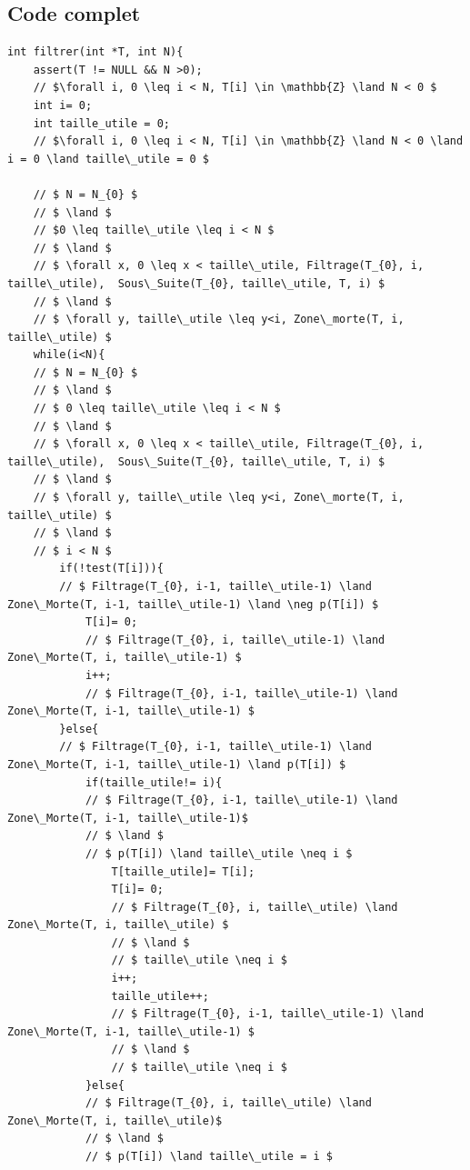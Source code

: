 \documentclass[a4paper, 11pt, oneside]{article}
\begin{document}
\subsection{Code complet}
\begin{lstlisting}
int filtrer(int *T, int N){
    assert(T != NULL && N >0);
    // $\forall i, 0 \leq i < N, T[i] \in \mathbb{Z} \land N < 0 $
    int i= 0;
    int taille_utile = 0;
    // $\forall i, 0 \leq i < N, T[i] \in \mathbb{Z} \land N < 0 \land i = 0 \land taille\_utile = 0 $ 

    // $ N = N_{0} $
    // $ \land $
    // $0 \leq taille\_utile \leq i < N $
    // $ \land $
    // $ \forall x, 0 \leq x < taille\_utile, Filtrage(T_{0}, i, taille\_utile),  Sous\_Suite(T_{0}, taille\_utile, T, i) $
    // $ \land $
    // $ \forall y, taille\_utile \leq y<i, Zone\_morte(T, i, taille\_utile) $
    while(i<N){
    // $ N = N_{0} $
    // $ \land $
    // $ 0 \leq taille\_utile \leq i < N $
    // $ \land $
    // $ \forall x, 0 \leq x < taille\_utile, Filtrage(T_{0}, i, taille\_utile),  Sous\_Suite(T_{0}, taille\_utile, T, i) $
    // $ \land $
    // $ \forall y, taille\_utile \leq y<i, Zone\_morte(T, i, taille\_utile) $
    // $ \land $
    // $ i < N $
        if(!test(T[i])){
        // $ Filtrage(T_{0}, i-1, taille\_utile-1) \land  Zone\_Morte(T, i-1, taille\_utile-1) \land \neg p(T[i]) $
            T[i]= 0;
            // $ Filtrage(T_{0}, i, taille\_utile-1) \land  Zone\_Morte(T, i, taille\_utile-1) $
            i++;
            // $ Filtrage(T_{0}, i-1, taille\_utile-1) \land  Zone\_Morte(T, i-1, taille\_utile-1) $
        }else{
        // $ Filtrage(T_{0}, i-1, taille\_utile-1) \land  Zone\_Morte(T, i-1, taille\_utile-1) \land p(T[i]) $
            if(taille_utile!= i){
            // $ Filtrage(T_{0}, i-1, taille\_utile-1) \land  Zone\_Morte(T, i-1, taille\_utile-1)$
            // $ \land $
            // $ p(T[i]) \land taille\_utile \neq i $
                T[taille_utile]= T[i];
                T[i]= 0;
                // $ Filtrage(T_{0}, i, taille\_utile) \land  Zone\_Morte(T, i, taille\_utile) $
                // $ \land $
                // $ taille\_utile \neq i $
                i++;
                taille_utile++;
                // $ Filtrage(T_{0}, i-1, taille\_utile-1) \land  Zone\_Morte(T, i-1, taille\_utile-1) $
                // $ \land $
                // $ taille\_utile \neq i $
            }else{
            // $ Filtrage(T_{0}, i, taille\_utile) \land  Zone\_Morte(T, i, taille\_utile)$
            // $ \land $
            // $ p(T[i]) \land taille\_utile = i $

\end{lstlisting}
\end{document}
